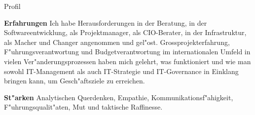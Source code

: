 \begin{rubric}{Profil}

\entry* \textbf{Erfahrungen}\newline 
Ich habe Herausforderungen in der Beratung, in der Softwareentwicklung, als Projektmanager, als CIO-Berater, in der Infrastruktur, als Macher und Changer angenommen und gel"ost. Grossprojekterfahrung, F"uhrungsverantwortung und Budgetverantwortung im internationalen Umfeld in vielen Ver"anderungsprozessen haben mich gelehrt, was funktioniert und wie man sowohl IT-Management als auch IT-Strategie und IT-Governance in Einklang bringen kann, um Gesch"aftsziele zu erreichen. 

\entry* \textbf{St"arken}\newline 
Analytischen Querdenken, Empathie, Kommunikationsf"ahigkeit, F"uhrungsqualit"aten, Mut und taktische Raffinesse.  
\end{rubric}
